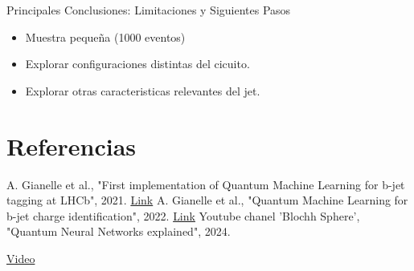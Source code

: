 \documentclass{beamer}
\begin{document}
\begin{frame}{Principales Conclusiones: Limitaciones y Siguientes Pasos}
  \begin{itemize}
    \item Muestra pequeña (1000 eventos)
    \item Explorar configuraciones distintas del cicuito.
    \item Explorar otras caracteristicas relevantes del jet.
  \end{itemize}
\end{frame}

\section{Referencias}

\begin{frame}
  \begin{thebibliography}{9}
      A. Gianelle et al., "First implementation of Quantum Machine Learning for b-jet tagging at LHCb", 2021. \href{https://indico.cern.ch/event/1053287/contributions/4442055/attachments/2332563/3975381/qml@lhcb_zuliani.pdf}{Link}
      A. Gianelle et al., "Quantum Machine Learning for b-jet charge identification", 2022. \href{https://arxiv.org/pdf/2202.13943}{Link}
      Youtube chanel 'Blochh Sphere', "Quantum Neural Networks explained", 2024.
    \end{thebibliography} \href{https://youtu.be/xL383DseSpE}{Video}
\end{frame}
\end{document}
